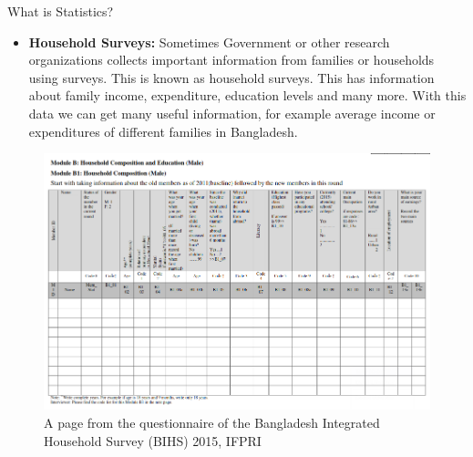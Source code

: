 \documentclass[8pt, usepdftitle=false]{beamer}
\begin{document}
\begin{frame}{What is Statistics?}
\begin{itemize}
\item

  \textbf{Household Surveys:} Sometimes Government or other research organizations collects important information from families or households using surveys.  This is known as \alert{household surveys}. This has information about family income,
  expenditure, education levels and many more. With this data we can get many useful information, for example average income or expenditures of different families in  Bangladesh. 

\end{itemize}
  \vspace*{-.2cm}
  \begin{figure}
\includegraphics[scale = .3]{Images/survey_data.png}
\vspace*{-.3cm}
\caption{A page from the questionnaire of the Bangladesh Integrated Household Survey (BIHS) 2015, IFPRI}
\end{figure}




\end{frame}


\end{document}
